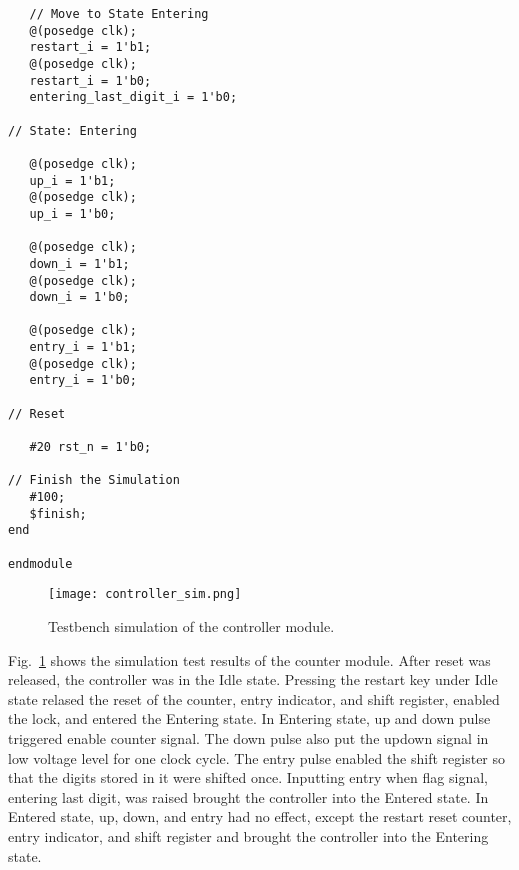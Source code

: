 \begin{verbatim}
   // Move to State Entering
   @(posedge clk);
   restart_i = 1'b1;
   @(posedge clk);
   restart_i = 1'b0;
   entering_last_digit_i = 1'b0;

// State: Entering

   @(posedge clk);
   up_i = 1'b1;
   @(posedge clk);
   up_i = 1'b0;

   @(posedge clk);
   down_i = 1'b1;
   @(posedge clk);
   down_i = 1'b0;

   @(posedge clk);
   entry_i = 1'b1;
   @(posedge clk);
   entry_i = 1'b0;

// Reset

   #20 rst_n = 1'b0;

// Finish the Simulation
   #100;
   $finish;
end

endmodule
\end{verbatim}

\begin{figure}[htbp]
   \centerline{
   \texttt{[image: controller\_sim.png]}}
   \caption{Testbench simulation of the controller module.}
   \label{fig:controller_sim}
\end{figure}

Fig.~\ref{fig:controller_sim} shows the simulation test results of the counter module. After reset was released, the controller was in the Idle state. Pressing the restart key under Idle state relased the reset of the counter, entry indicator, and shift register, enabled the lock, and entered the Entering state. In Entering state, up and down pulse triggered enable counter signal. The down pulse also put the updown signal in low voltage level for one clock cycle. The entry pulse enabled the shift register so that the digits stored in it were shifted once. Inputting entry when flag signal, entering last digit, was raised brought the controller into the Entered state. In Entered state, up, down, and entry had no effect, except the restart reset counter, entry indicator, and shift register and brought the controller into the Entering state.
